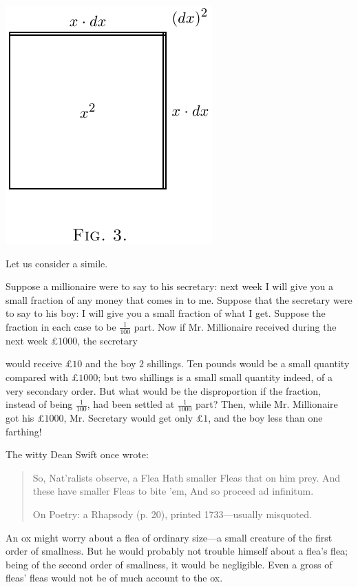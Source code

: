\documentclass{ximera}
\begin{document}
\begin{image}
  \includegraphics{019b.png}
\end{image}


Let us consider a simile.

Suppose a millionaire were to say to his secretary: next week I will
give you a small fraction of any money that comes in to me. Suppose
that the secretary were to say to his boy: I will give you a small
fraction of what I get. Suppose the fraction in each case to be
$\frac{1}{100}$ part. Now if Mr. Millionaire received during the next
week £$1000$, the secretary

would receive \pounds$10$ and the boy $2$ shillings. Ten
pounds would be a small quantity compared with
£$1000$; but two shillings is a small small quantity
indeed, of a very secondary order. But what would
be the disproportion if the fraction, instead of being $\frac{1}{100}$,
had been settled at $\frac{1}{1000}$ part? Then, while
Mr. Millionaire got his £$1000$, Mr. Secretary would
get only \pounds$1$, and the boy less than one farthing!

The witty Dean Swift once wrote:

\begin{quote}
So, Nat'ralists observe, a Flea Hath smaller Fleas that on him prey.
And these have smaller Fleas to bite 'em, And so proceed ad
infinitum.

\hfill On Poetry: a Rhapsody (p. 20), printed 1733---usually
misquoted.
\end{quote}

An ox might worry about a flea of ordinary size---a small creature of
the first order of smallness.  But he would probably not trouble
himself about a flea's flea; being of the second order of smallness,
it would be negligible. Even a gross of fleas' fleas would not be of
much account to the ox.
\end{document}
